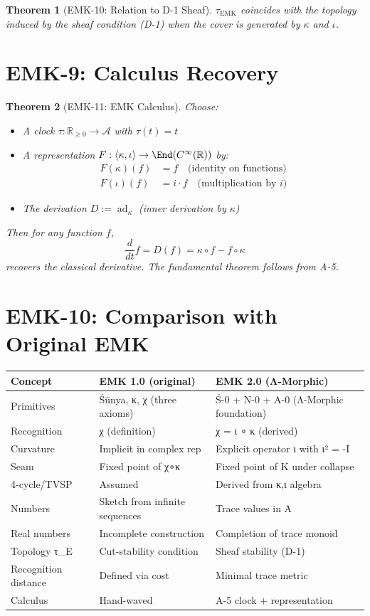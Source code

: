 \documentclass[12pt, oneside]{article}
\newtheorem{theorem}{Theorem}[section]
\DeclareMathOperator{\ad}{ad}
\newcommand{\A}{\mathcal{A}}
\begin{document}
\begin{theorem}[EMK-10: Relation to D-1 Sheaf]
$\tau_{\text{EMK}}$ coincides with the topology induced by the sheaf condition (D-1) when the cover is generated by $\kappa$ and $\iota$.
\end{theorem}

\section{EMK-9: Calculus Recovery}

\begin{theorem}[EMK-11: EMK Calculus]
Choose:
\begin{itemize}
    \item A clock $\tau: \mathbb{R}_{\ge 0} \rightarrow \A$ with $\tau(t) = t$
    \item A representation $F: \langle \kappa, \iota \rangle \rightarrow \End(C^\infty(\mathbb{R}))$ by:
    \begin{align*}
        F(\kappa)(f) &= f \quad \text{(identity on functions)}\\
        F(\iota)(f) &= i \cdot f \quad \text{(multiplication by } i\text{)}
    \end{align*}
    \item The derivation $D := \ad_{\kappa}$ (inner derivation by $\kappa$)
\end{itemize}
Then for any function $f$,
\[
\frac{d}{dt} f = D(f) = \kappa \circ f - f \circ \kappa
\]
recovers the classical derivative. The fundamental theorem follows from A-5.
\end{theorem}

\section{EMK-10: Comparison with Original EMK}

\begin{tabular}{|l|l|l|}
\hline
\textbf{Concept} & \textbf{EMK 1.0 (original)} & \textbf{EMK 2.0 (Λ-Morphic)} \\
\hline
Primitives & Śūnya, κ, χ (three axioms) & Ś-0 + N-0 + A-0 (Λ-Morphic foundation) \\
Recognition & χ (definition) & χ = ι ∘ κ (derived) \\
Curvature & Implicit in complex rep & Explicit operator ι with ι² = -I \\
Seam & Fixed point of χ∘κ & Fixed point of K under collapse \\
4-cycle/TVSP & Assumed & Derived from κ,ι algebra \\
Numbers & Sketch from infinite sequences & Trace values in A \\
Real numbers & Incomplete construction & Completion of trace monoid \\
Topology τ_E & Cut-stability condition & Sheaf stability (D-1) \\
Recognition distance & Defined via cost & Minimal trace metric \\
Calculus & Hand-waved & A-5 clock + representation \\
\hline
\end{tabular}
\end{document}
